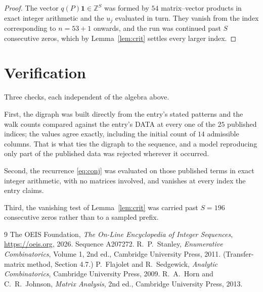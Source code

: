 \documentclass[11pt,a4paper]{article}
\theoremstyle{plain}
\theoremstyle{definition}
\begin{document}
\begin{proof}
The vector $q(P)\mathbf{1}\in\mathbb{Z}^{S}$ was formed by $54$ matrix--vector
products in exact integer arithmetic and the $u_j$ evaluated in turn. They vanish from the
index corresponding to $n=53+1$ onwards, and the run was continued past $S$ consecutive
zeros, which by Lemma~\ref{lem:crit} settles every larger index.
\end{proof}

\section{Verification}

Three checks, each independent of the algebra above.

First, the digraph was built directly from the entry's stated patterns and the walk counts
compared against the entry's DATA at every one of the $25$ published indices; the
values agree exactly, including the initial count of $14$ admissible columns. That is
what ties the digraph to the sequence, and a model reproducing only part of the published
data was rejected wherever it occurred.

Second, the recurrence \eqref{eq:conj} was evaluated on those published terms in exact
integer arithmetic, with no matrices involved, and vanishes at every index the entry claims.

Third, the vanishing test of Lemma~\ref{lem:crit} was carried past $S=196$ consecutive
zeros rather than to a sampled prefix.

\begin{thebibliography}{9}
 The OEIS Foundation, \emph{The On-Line Encyclopedia of Integer
Sequences}, \url{https://oeis.org}, 2026. Sequence A207272.
 R.~P.~Stanley, \emph{Enumerative Combinatorics}, Volume 1, 2nd ed.,
Cambridge University Press, 2011. (Transfer-matrix method, Section 4.7.)
 P.~Flajolet and R.~Sedgewick, \emph{Analytic Combinatorics}, Cambridge
University Press, 2009.
 R.~A.~Horn and C.~R.~Johnson, \emph{Matrix Analysis}, 2nd ed., Cambridge
University Press, 2013.
\end{thebibliography}
\end{document}
